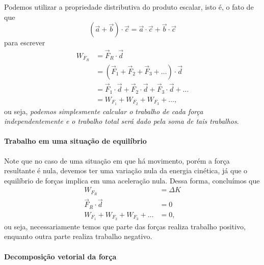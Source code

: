 Podemos utilizar a propriedade distributiva do produto escalar, isto é, o fato de que
\begin{equation}
    (\vec{a} + \vec{b})\cdot \vec{c} = \vec{a}\cdot\vec{c} + \vec{b} \cdot\vec{c}
\end{equation}
%
para escrever
\begin{align}
    W_{F_R} &= \vec{F}_R \cdot \vec{d} \\
    &= (\vec{F}_1 + \vec{F}_2 + \vec{F}_3 + \dots) \cdot \vec{d} \\
    &= \vec{F}_1 \cdot \vec{d} + \vec{F}_2 \cdot \vec{d} + \vec{F}_3 \cdot \vec{d} + \dots \\
    &= W_{F_1} + W_{F_2} +  W_{F_3} + \dots, 
\end{align}
%
ou seja, \emph{podemos simplesmente calcular o trabalho de cada força independentemente e o trabalho total será dado pela soma de tais trabalhos}. 

\paragraph{Trabalho em uma situação de equilíbrio}

Note que no caso de uma situação em que há movimento, porém a força resultante é nula, devemos ter uma variação nula da energia cinética, já que o equilíbrio de forças implica em uma aceleração nula. Dessa forma, concluímos que
\begin{align}
    W_{F_R} &= \Delta K \\
    \vec{F}_R \cdot \vec{d} & = 0 \\
    W_{F_1} + W_{F_2} +  W_{F_3} + \dots &= 0, 
\end{align}
%
ou seja, necessariamente temos que parte das forças realiza trabalho positivo, enquanto outra parte realiza trabalho negativo.

\paragraph{Decomposição vetorial da força}

